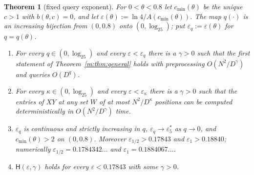 \documentclass[11pt]{article}
\newtheorem{theorem}{Theorem}[section]
\theoremstyle{definition}
\theoremstyle{remark}
\newcommand{\es}{\varepsilon^*_5}
\newcommand{\Hyp}{\mathsf{H}}
\newcommand{\HintedOMvRfourteen}{0.18840}%
\newcommand{\HypHalfRfourteen}{0.17843}%
\newcommand{\EpsHalfDigits}{0.1784342}%
\newcommand{\EpsOneDigits}{0.1884067}%
\begin{document}
\begin{theorem}[fixed query exponent]\label{m:thm:fixedq}
For $0<\theta<0.8$ let $c_{\min}(\theta)$ be the unique $c>1$ with $b(\theta,c)=0$, and let $\varepsilon(\theta):=\ln4/A(c_{\min}(\theta))$. The map $q(\cdot)$ is an increasing bijection from $(0,0.8)$ onto $(0,\log_25)$; put $\varepsilon_q:=\varepsilon(\theta)$ for $q=q(\theta)$.
\begin{enumerate}[label=(\roman*),nosep]
\item For every $q\in(0,\log_25)$ and every $\varepsilon<\varepsilon_q$ there is a $\gamma>0$ such that the first statement of Theorem~\ref{m:thm:general} holds with preprocessing $O(N^2/D^\gamma)$ and queries $O(D^q)$.
\item For every $\kappa\in(0,\log_25)$ and every $\varepsilon<\varepsilon_\kappa$ there is a $\gamma>0$ such that the entries of $XY$ at any set $W$ of at most $N^2/D^\kappa$ positions can be computed deterministically in $O(N^2/D^\gamma)$ time.
\item $\varepsilon_q$ is continuous and strictly increasing in $q$, $\varepsilon_q\to\es$ as $q\to0$, and $c_{\min}(\theta)>2$ on $(0,0.8)$.
Moreover $\varepsilon_{1/2}>\HypHalfRfourteen$ and $\varepsilon_1>\HintedOMvRfourteen$; numerically $\varepsilon_{1/2}=\EpsHalfDigits\ldots$ and $\varepsilon_1=\EpsOneDigits\ldots$.
\item $\Hyp(\varepsilon,\gamma)$ holds for every $\varepsilon<\HypHalfRfourteen$ with some $\gamma>0$.
\end{enumerate}
\end{theorem}
\end{document}
